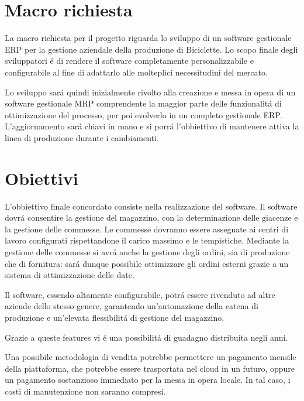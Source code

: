 \documentclass[../../documentazione.tex]{subfiles}
\begin{document}
    \section{Macro richiesta}\label{sec:macro-richiesta}

    La macro richiesta per il progetto riguarda lo sviluppo di un software gestionale ERP per la gestione aziendale
    della produzione di Biciclette.
    Lo scopo finale degli sviluppatori é di rendere il software completamente personalizzabile e configurabile
    al fine di adattarlo alle molteplici necessitudini del mercato.

    Lo sviluppo sará quindi inizialmente rivolto alla creazione e messa in opera di un software gestionale MRP
    comprendente la maggior parte delle funzionalitá di ottimizzazione del processo, per poi evolverlo in un completo
    gestionale ERP.
    L'aggiornamento sará chiavi in mano e si porrá l'obbiettivo di mantenere attiva la linea di produzione
    durante i cambiamenti.

    \section{Obiettivi}\label{sec:obbiettivi}

    L'obbiettivo finale concordato consiste nella realizzazione del software.
    Il software dovrá consentire la gestione del magazzino, con la determinazione delle giacenze e la gestione delle commesse.
    Le commesse dovranno essere assegnate ai centri di lavoro configurati rispettandone il carico massimo e le tempistiche.
    Mediante la gestione delle commesse si avrá anche la gestione degli ordini, sia di produzione che di fornitura:
    sará dunque possibile ottimizzare gli ordini esterni grazie a un sistema di ottimizzazione delle date.

    Il software, essendo altamente configurabile, potrá essere rivenduto ad altre aziende dello stesso genere,
    garantendo un'automazione della catena di produzione e un'elevata flessibilitá di gestione del magazzino.

    Grazie a queste features vi é una possibilitá di guadagno distribuita negli anni.

    Una possibile metodologia di vendita potrebbe permettere un pagamento mensile della piattaforma, che potrebbe essere
    trasportata nel cloud in un futuro, oppure un pagamento sostanzioso immediato per la messa in opera locale.
    In tal caso, i costi di manutenzione non saranno compresi.
\end{document}
